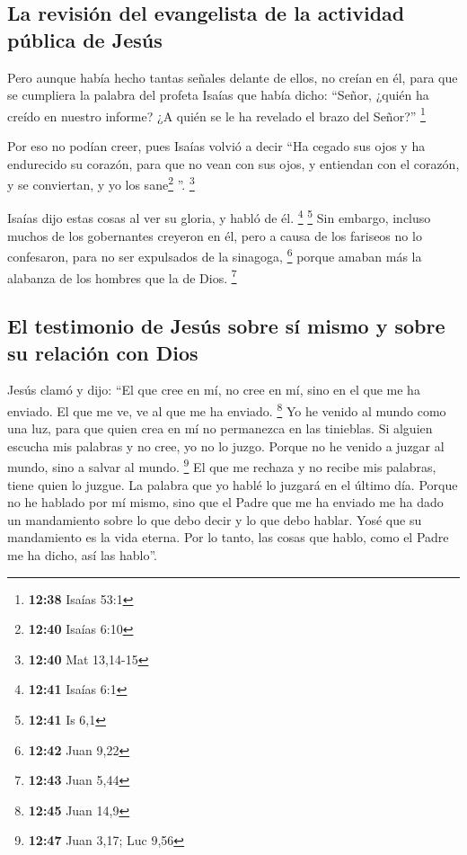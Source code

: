 \begin{paracol}{2}
\hypertarget{la-revisiuxf3n-del-evangelista-de-la-actividad-puxfablica-de-jesuxfas}{%
\subsection{La revisión del evangelista de la actividad pública de
Jesús}\label{la-revisiuxf3n-del-evangelista-de-la-actividad-puxfablica-de-jesuxfas}}

 Pero aunque había hecho tantas señales delante de ellos,
no creían en él,  para que se cumpliera la palabra del
profeta Isaías que había dicho: ``Señor, ¿quién ha creído en nuestro
informe? ¿A quién se le ha revelado el brazo del Señor?'' \footnote{\textbf{12:38}
  Isaías 53:1}

 Por eso no podían creer, pues Isaías volvió a decir
 ``Ha cegado sus ojos y ha endurecido su corazón, para
que no vean con sus ojos, y entiendan con el corazón, y se conviertan, y
yo los sane\footnote{\textbf{12:40} Isaías 6:10} ''. \footnote{\textbf{12:40}
  Mat 13,14-15}

 Isaías dijo estas cosas al ver su gloria, y habló de él.
\footnote{\textbf{12:41} Isaías 6:1} \footnote{\textbf{12:41} Is 6,1}
 Sin embargo, incluso muchos de los gobernantes creyeron
en él, pero a causa de los fariseos no lo confesaron, para no ser
expulsados de la sinagoga, \footnote{\textbf{12:42} Juan 9,22}
 porque amaban más la alabanza de los hombres que la de
Dios. \footnote{\textbf{12:43} Juan 5,44}

\hypertarget{el-testimonio-de-jesuxfas-sobre-suxed-mismo-y-sobre-su-relaciuxf3n-con-dios}{%
\subsection{El testimonio de Jesús sobre sí mismo y sobre su relación
con
Dios}\label{el-testimonio-de-jesuxfas-sobre-suxed-mismo-y-sobre-su-relaciuxf3n-con-dios}}

 Jesús clamó y dijo: ``El que cree en mí, no cree en mí,
sino en el que me ha enviado.  El que me ve, ve al que me
ha enviado. \footnote{\textbf{12:45} Juan 14,9}  Yo he
venido al mundo como una luz, para que quien crea en mí no permanezca en
las tinieblas.  Si alguien escucha mis palabras y no
cree, yo no lo juzgo. Porque no he venido a juzgar al mundo, sino a
salvar al mundo. \footnote{\textbf{12:47} Juan 3,17; Luc 9,56}
 El que me rechaza y no recibe mis palabras, tiene quien
lo juzgue. La palabra que yo hablé lo juzgará en el último día.
 Porque no he hablado por mí mismo, sino que el Padre que
me ha enviado me ha dado un mandamiento sobre lo que debo decir y lo que
debo hablar.  Yosé que su mandamiento es la vida eterna.
Por lo tanto, las cosas que hablo, como el Padre me ha dicho, así las
hablo''.


\end{paracol}
